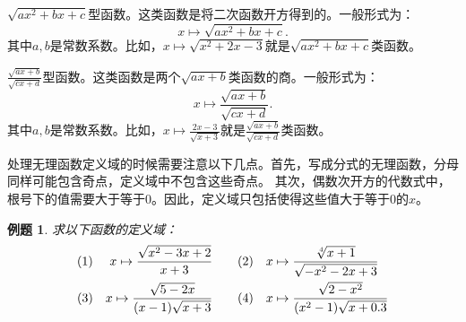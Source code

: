 \documentclass[12pt,UTF8]{ctexbook}
\newtheorem{et}{例题}[section]
\begin{document}
$\sqrt{ax^2 + bx + c}$型函数。这类函数是将二次函数开方得到的。一般形式为：
$$ x\mapsto \sqrt{ax^2 + bx + c}.$$
其中$a, b$是常数系数。比如，$x\mapsto \sqrt{x^2 + 2x - 3}$就是$\sqrt{ax^2 + bx + c}$类函数。

$\frac{\sqrt{ax + b}}{\sqrt{cx + d}}$型函数。这类函数是两个$\sqrt{ax + b}$类函数的商。一般形式为：
$$ x\mapsto \frac{\sqrt{ax + b}}{\sqrt{cx + d}}.$$
其中$a, b$是常数系数。比如，$x\mapsto \frac{2x - 3}{\sqrt{x + 3}}$就是$\frac{\sqrt{ax + b}}{\sqrt{cx + d}}$类函数。

处理无理函数定义域的时候需要注意以下几点。首先，写成分式的无理函数，分母同样可能包含奇点，定义域中不包含这些奇点。
其次，偶数次开方的代数式中，根号下的值需要大于等于$0$。因此，定义域只包括使得这些值大于等于$0$的$x$。

\begin{et}
    求以下函数的定义域：\\
    \begin{align}
        (1) \,\,\quad x\mapsto \frac{\sqrt{x^2 - 3x + 2}}{x + 3} \quad & \quad (2) \quad x\mapsto \frac{\sqrt[4]{x + 1}}{\sqrt{- x^2 - 2x + 3}}\notag \\
        (3) \quad x\mapsto \frac{\sqrt{5 - 2x}}{(x - 1)\sqrt{x + 3}} \quad & \quad (4)\quad x\mapsto \frac{\sqrt{2 - x^2}}{(x^2 - 1)\sqrt{x + 0.3}} \notag 
    \end{align}
\end{et}
\end{document}
